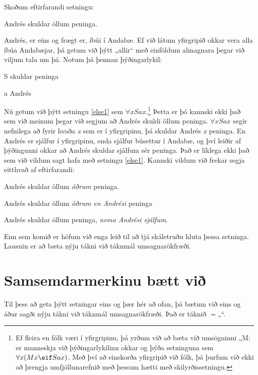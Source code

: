 Skoðum eftirfarandi setningu: 
\begin{earg}
\item[\ex{else1}] Andrés skuldar öllum peninga.
\end{earg}
Andrés, er eins og frægt er, íbúi í Andabæ. Ef við látum yfirgripið okkar vera alla íbúa Andabæjar, þá getum við þýtt „allir“ með einföldum almagnara þegar við viljum tala um þá. Notum þá þennan þýðingarlykil:
	\begin{ekey}
		\item[S]  skuldar  peninga
		\item[a] Andrés
	\end{ekey}
Nú getum við þýtt setningu \ref{else1} sem $\forall x Sax$.\footnote{Ef fleira en fólk væri í yfirgripinu, þá yrðum við að bæta við umsögninni „M:  er manneskja við þýðingarlykilinn okkar og þýða setninguna sem $\forall x (Mx \eif Sax)$. Með því að einskorða yfirgripið við fólk, þá þurfum við ekki að þrengja umfjöllunarefnið með þessum hætti með skilyrðissetningu.} Þetta er þó kannski ekki það sem við meinum þegar við segjum að Andrés skuldi öllum peninga. $\forall x Sax$ segir nefnilega að fyrir hvaða \emph{x} sem er í yfirgripinu, þá skuldar Andrés \emph{x} peninga. En Andrés er sjálfur í yfirgripinu, enda sjálfur búsettur í Andabæ, og því leiðir af þýðingunni okkar að Andrés skuldar sjálfum sér peninga. Það er líklega ekki það sem við vildum sagt hafa með setningu \ref{else1}. Kannski vildum við frekar segja eitthvað af eftirfarandi:
	\begin{earg}
		\item[\ex{else1b}] Andrés skuldar öllum \emph{öðrum} peninga.
		\item[\ex{else1c}] Andrés skuldar öllum \emph{öðrum en Andrési} peninga
		\item[\ex{else1d}] Andrés skuldar öllum peninga, \emph{nema Andrési sjálfum}.
	\end{earg}
Enn sem komið er höfum við enga leið til að tjá skáletruðu hluta þessa setninga. Lausnin er að bæta nýju tákni við táknmál umsagnarökfræði.

\section{Samsemdarmerkinu bætt við}

Til þess að geta þýtt setningar eins og þær hér að ofan, þá bætum við eins og áður sagði nýju tákni við táknmál umsagnarökfræði. Það er táknið $=$„“. 

